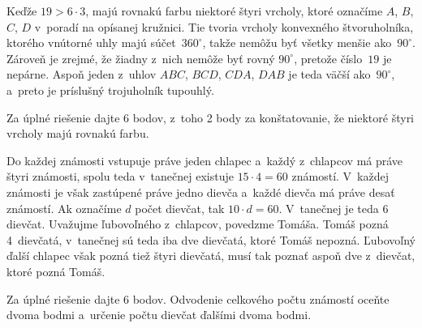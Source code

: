 {%
Keďže $19>6\cdot3$, majú rovnakú farbu niektoré štyri vrcholy,
ktoré označíme $A$, $B$, $C$, $D$ v~poradí na opísanej kružnici.
Tie tvoria vrcholy konvexného štvoruholníka, ktorého vnútorné uhly majú
súčet~$360^{\circ}$,
takže nemôžu byť všetky menšie ako~$90^{\circ}$. Zároveň je
zrejmé, že žiadny z~nich nemôže byť rovný $90^{\circ}$, pretože číslo~$19$ je
nepárne. Aspoň jeden z~uhlov $ABC$, $BCD$, $CDA$, $DAB$ je teda
väčší ako~$90^{\circ}$, a~preto je príslušný trojuholník tupouhlý.

\nobreak\medskip\petit\noindent
Za úplné riešenie dajte 6 bodov, z~toho 2 body za konštatovanie,
že niektoré štyri vrcholy majú rovnakú farbu.
\endpetit
\bigbreak}

{%
Do každej známosti vstupuje práve jeden chlapec a~každý z~chlapcov má
práve štyri známosti, spolu teda v~tanečnej existuje $15\cdot 4=60$
známostí. V~každej známosti je však zastúpené práve jedno dievča a~každé
dievča má práve desať známostí. Ak označíme $d$ počet dievčat, tak $10\cdot
d=60$. V~tanečnej je teda 6 dievčat. Uvažujme ľubovoľného z~chlapcov,
povedzme Tomáša. Tomáš pozná 4~dievčatá, v~tanečnej sú teda iba dve
dievčatá, ktoré Tomáš nepozná. Ľubovoľný ďalší chlapec však pozná tiež štyri
dievčatá, musí tak poznať aspoň dve z~dievčat, ktoré pozná Tomáš.


\nobreak\medskip\petit\noindent
Za úplné riešenie dajte 6 bodov.
Odvodenie celkového počtu
známostí oceňte dvoma bodmi a~určenie počtu dievčat ďalšími dvoma bodmi.
\endpetit}

